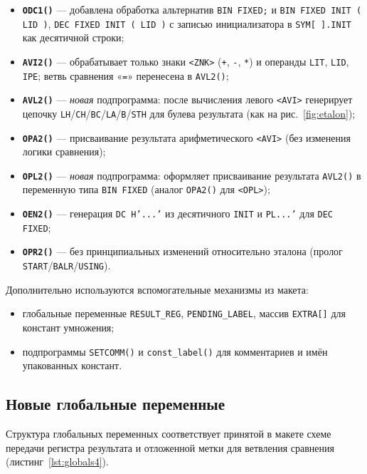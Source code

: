 \documentclass[a4paper,14pt]{extarticle}
\begin{document}
\begin{itemize}
  \item \textbf{\texttt{ODC1()}} — добавлена обработка альтернатив \texttt{BIN FIXED;} и \texttt{BIN FIXED INIT ( LID )},
        \texttt{DEC FIXED INIT ( LID )} с записью инициализатора в \texttt{SYM[ ].INIT} как десятичной строки;
  \item \textbf{\texttt{AVI2()}} — обрабатывает только знаки \texttt{<ZNK>} (\texttt{+}, \texttt{-}, \texttt{*}) и операнды
        \texttt{LIT}, \texttt{LID}, \texttt{IPE}; ветвь сравнения «\texttt{=}» перенесена в \texttt{AVL2()};
  \item \textbf{\texttt{AVL2()}} — \textit{новая} подпрограмма: после вычисления левого \texttt{<AVI>} генерирует цепочку
        \texttt{LH}/\texttt{CH}/\texttt{BC}/\texttt{LA}/\texttt{B}/\texttt{STH} для булева результата (как на рис.~\ref{fig:etalon});
  \item \textbf{\texttt{OPA2()}} — присваивание результата арифметического \texttt{<AVI>} (без изменения логики сравнения);
  \item \textbf{\texttt{OPL2()}} — \textit{новая} подпрограмма: оформляет присваивание результата \texttt{AVL2()} в переменную
        типа \texttt{BIN FIXED} (аналог \texttt{OPA2()} для \texttt{<OPL>});
  \item \textbf{\texttt{OEN2()}} — генерация \texttt{DC H'...'} из десятичного \texttt{INIT} и \texttt{PL...'} для \texttt{DEC FIXED};
  \item \textbf{\texttt{OPR2()}} — без принципиальных изменений относительно эталона (пролог \texttt{START}/\texttt{BALR}/\texttt{USING}).
\end{itemize}

Дополнительно используются вспомогательные механизмы из макета:
\begin{itemize}
  \item глобальные переменные \texttt{RESULT\_REG}, \texttt{PENDING\_LABEL}, массив \texttt{EXTRA[]} для констант умножения;
  \item подпрограммы \texttt{SETCOMM()} и \texttt{const\_label()} для комментариев и имён упакованных констант.
\end{itemize}

\subsection{Новые глобальные переменные}

Структура глобальных переменных соответствует принятой в макете схеме передачи регистра результата и отложенной метки
для ветвления сравнения (листинг~\ref{lst:globals4}).
\end{document}
